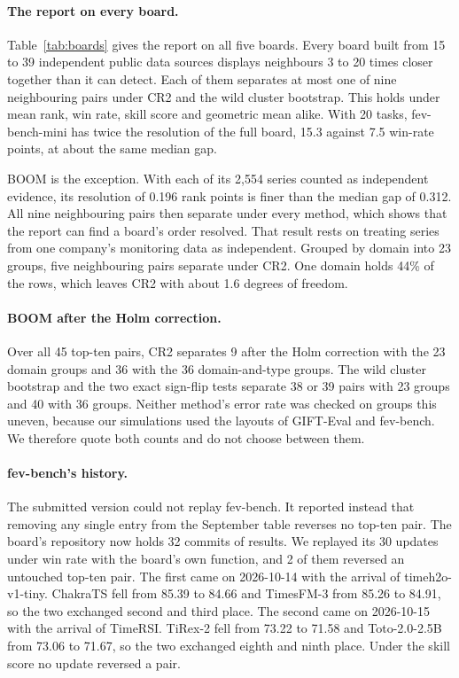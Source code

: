 \documentclass{article}
\begin{document}
\paragraph{The report on every board.} Table~\ref{tab:boards} gives the report on all five
boards. Every board built from 15 to 39 independent public data sources displays neighbours 3 to 20 times
closer together than it can detect. Each of them separates at most one of nine neighbouring
pairs under CR2 and the wild cluster bootstrap. This holds under mean rank, win rate, skill
score and geometric mean alike. With 20 tasks, fev-bench-mini has twice the resolution of the
full board, 15.3 against 7.5 win-rate points, at about the same median gap.

BOOM is the exception. With each of its 2,554 series counted as independent evidence, its
resolution of 0.196 rank points is finer than the median gap of 0.312. All nine neighbouring
pairs then separate under every method, which shows that the report can find a board's order
resolved. That result rests on treating series from one company's monitoring data as independent.
Grouped by domain into 23 groups, five neighbouring pairs separate under CR2. One domain holds
44\% of the rows, which leaves CR2 with about 1.6 degrees of freedom.

\paragraph{BOOM after the Holm correction.} Over all 45 top-ten pairs, CR2 separates 9 after
the Holm correction with the 23 domain groups and 36 with the 36 domain-and-type groups. The
wild cluster bootstrap and the two exact sign-flip tests separate 38 or 39 pairs with 23 groups
and 40 with 36 groups. Neither method's error rate was checked on groups this uneven, because
our simulations used the layouts of GIFT-Eval and fev-bench. We therefore quote both counts and
do not choose between them.

\paragraph{fev-bench's history.} The submitted version could not replay fev-bench. It reported
instead that removing any single entry from the September table reverses no top-ten pair. The
board's repository now holds 32 commits of results. We replayed its 30 updates under win rate
with the board's own function, and 2 of them reversed an untouched top-ten pair. The first came
on 2026-10-14 with the arrival of timeh2o-v1-tiny. ChakraTS fell from 85.39 to 84.66 and
TimesFM-3 from 85.26 to 84.91, so the two exchanged second and third place. The second came on
2026-10-15 with the arrival of TimeRSI. TiRex-2 fell from 73.22 to 71.58 and Toto-2.0-2.5B
from 73.06 to 71.67, so the two exchanged eighth and ninth place. Under the skill score no
update reversed a pair.
\end{document}
